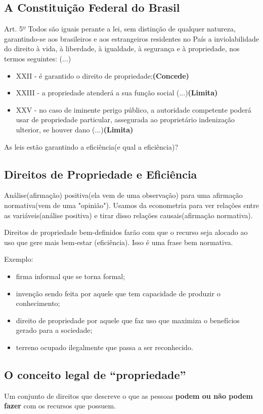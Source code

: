 \documentclass[a4paper,12pt]{article}[abntex2]
\begin{document}
\subsection{\textbf{A Constituição Federal do Brasil}}
Art. 5º Todos são iguais perante a lei, sem distinção de qualquer natureza, garantindo-se aos brasileiros e aos estrangeiros residentes no País a inviolabilidade do direito à vida, à liberdade, à igualdade, à segurança e à propriedade, nos termos seguintes: (...) \begin{itemize}
	\item XXII - é garantido o direito de propriedade;\textbf{(Concede)}
	\item XXIII - a propriedade atenderá a sua função social (...)\textbf{(Limita)}
	\item XXV - no caso de iminente perigo público, a autoridade competente poderá usar de propriedade particular, assegurada ao proprietário indenização ulterior, se houver dano (...)\textbf{(Limita)}
\end{itemize}

As leis estão garantindo a eficiência(e qual a eficiência)? 

\subsection{\textbf{Direitos de Propriedade e Eficiência}}
Análise(afirmação) positiva(ela vem de uma observação) para uma afirmação normativa(vem de uma "opinião"). Usamos da econometria para ver relações entre as variáveis(análise positiva) e tirar disso relações causais(afirmação normativa).

Direitos de propriedade bem-definidos farão com que o recurso seja alocado ao uso que gere mais bem-estar (eficiência). Isso é uma frase bem normativa.

Exemplo:\begin{itemize} 
    \item firma informal que se torna formal; 
    \item invenção sendo feita por aquele que tem capacidade de produzir o conhecimento;
    \item direito de propriedade por aquele que faz uso que maximiza o benefícios gerado para a sociedade;
    \item terreno ocupado ilegalmente que passa a ser reconhecido.
\end{itemize}

\subsection{\textbf{O conceito legal de “propriedade''}}
Um conjunto de direitos que descreve o que as pessoas \textbf{podem ou não podem fazer} com os recursos que possuem. 
\end{document}
